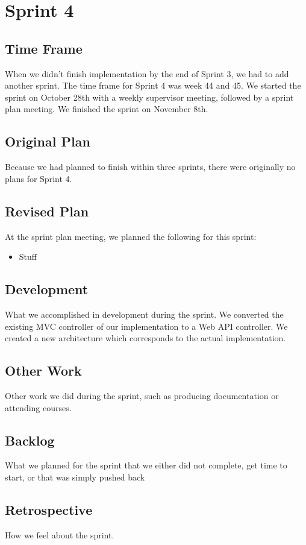 \section{Sprint 4}

\subsection{Time Frame}
When we didn't finish implementation by the end of Sprint 3, we had to add another sprint. The time frame for Sprint 4 was week 44 and 45. We started the sprint on October 28th with a weekly supervisor meeting, followed by a sprint plan meeting. We finished the sprint on November 8th.

\subsection{Original Plan}
Because we had planned to finish within three sprints, there were originally no plans for Sprint 4.

\subsection{Revised Plan}
At the sprint plan meeting, we planned the following for this sprint:
\begin{itemize}
	\item Stuff
\end{itemize}

\subsection{Development}
What we accomplished in development during the sprint.
We converted the existing MVC controller of our implementation to a Web API controller.
We created a new architecture which corresponds to the actual implementation.


\subsection{Other Work}
Other work we did during the sprint, such as producing documentation or attending courses.

\subsection{Backlog}
What we planned for the sprint that we either did not complete, get time to start, or that was simply pushed back

\subsection{Retrospective}
How we feel about the sprint.